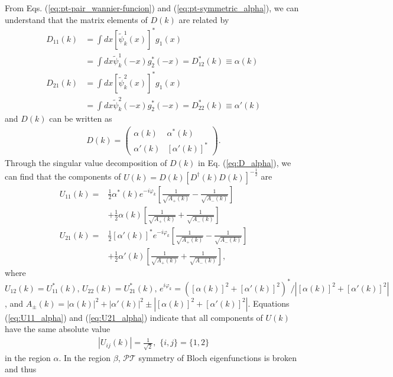 \documentclass[prb,superscriptaddress,floatfix,twocolumn,showpacs]{revtex4-2}
\begin{document}
From Eqs. (\ref{eq:pt-pair_wannier-funcion}) and (\ref{eq:pt-symmetric_alpha}), we can understand that the matrix elements of $D(k)$ are related by
\begin{align}
    D_{11}(k)&=\int dx[\tilde{\psi}_k^1(x)]^\ast g_1(x)\nonumber\\
    &=\int dx\tilde{\psi}_k^1(-x)g_2^\ast(-x)=D_{12}^\ast(k)\equiv\alpha(k)
    \label{eq:relation_D_alpha_1}\\
    D_{21}(k)&=\int dx[\tilde{\psi}_k^2(x)]^\ast g_1(x)\nonumber\\
    &=\int dx\tilde{\psi}_k^2(-x)g_2^\ast(-x)=D_{22}^\ast(k)\equiv\alpha'(k)    \label{eq:relation_D_alpha_2}
\end{align}
and $D(k)$ can be written as
\begin{align}
    D(k)=\begin{pmatrix}
    \alpha(k)&\alpha^\ast(k)\\
    \alpha'(k)&[\alpha'(k)]^\ast
    \end{pmatrix}.
    \label{eq:D_alpha}
\end{align}
Through the singular value decomposition of $D(k)$ in Eq. (\ref{eq:D_alpha}), we can find that the components of  $U(k)=D(k)[D^\dagger(k)D(k)]^{-\frac{1}{2}}$ are
\begin{align}
    U_{11}(k)=&\frac{1}{2}\alpha^\ast(k)e^{-i\varphi_k}
    \left[\frac{1}{\sqrt{A_+(k)}}-\frac{1}{\sqrt{A_-(k)}}\right]\nonumber\\
    &+\frac{1}{2}\alpha(k)\left[\frac{1}{\sqrt{A_+(k)}}+\frac{1}{\sqrt{A_-(k)}}\right]
    \label{eq:U11_alpha}\\
    U_{21}(k)=&\frac{1}{2}[\alpha'(k)]^\ast e^{-i\varphi_k}
    \left[\frac{1}{\sqrt{A_+(k)}}-\frac{1}{\sqrt{A_-(k)}}\right]\nonumber\\
    &+\frac{1}{2}\alpha'(k)
    \left[\frac{1}{\sqrt{A_+(k)}}+\frac{1}{\sqrt{A_-(k)}}\right],
    \label{eq:U21_alpha}
\end{align}
where $U_{12}(k)=U_{11}^\ast(k),\,U_{22}(k)=U_{21}^\ast(k),\,e^{i\varphi_k}=([\alpha(k)]^2+[\alpha'(k)]^2)^\ast/|[\alpha(k)]^2+[\alpha'(k)]^2|$, and $A_\pm(k)=|\alpha(k)|^2+|\alpha'(k)|^2\pm|[\alpha(k)]^2+[\alpha'(k)]^2|$. 
Equations (\ref{eq:U11_alpha}) and (\ref{eq:U21_alpha}) indicate that all components of $U(k)$ have the same absolute value
\begin{align}
    |U_{ij}(k)|=\frac{1}{\sqrt{2}},\,\,\{i,j\}=\{1,2\}
    \label{eq:magnitude_U_alpha}
\end{align}
in the region $\alpha$. 
In the region $\beta$, $\mathcal{PT}$ symmetry of Bloch eigenfunctions is broken and thus
\end{document}
